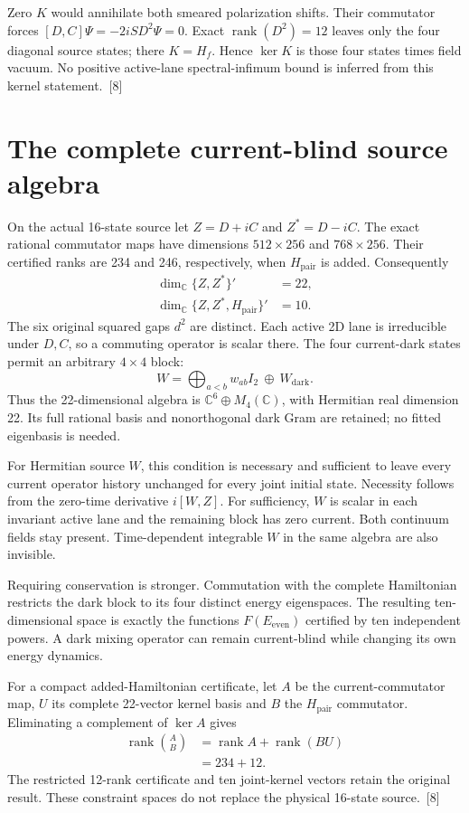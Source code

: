 \documentclass[10pt,twocolumn,letterpaper]{article}
\begin{document}
Zero $K$ would annihilate both smeared polarization shifts. Their commutator forces $[D,C]\Psi=-2iSD^2\Psi=0$. Exact $\operatorname{rank}(D^2)=12$ leaves only the four diagonal source states; there $K=H_f$. Hence $\ker K$ is those four states times field vacuum. No positive active-lane spectral-infimum bound is inferred from this kernel statement.~[8]

\section{The complete current-blind source algebra}
On the actual 16-state source let $Z=D+iC$ and $Z^*=D-iC$. The exact rational commutator maps have dimensions $512\times256$ and $768\times256$. Their certified ranks are 234 and 246, respectively, when $H_{\mathrm{pair}}$ is added. Consequently
\[
\begin{aligned}
\dim_{\mathbb C}\{Z,Z^*\}'&=22,\\
\dim_{\mathbb C}\{Z,Z^*,H_{\mathrm{pair}}\}'&=10.
\end{aligned}
\]
The six original squared gaps $d^2$ are distinct. Each active 2D lane is irreducible under $D,C$, so a commuting operator is scalar there. The four current-dark states permit an arbitrary $4\times4$ block:
\[
W=\bigoplus_{a<b}w_{ab}I_2\ \oplus\ W_{\mathrm{dark}}.
\]
Thus the 22-dimensional algebra is $\mathbb C^6\oplus M_4(\mathbb C)$, with Hermitian real dimension 22. Its full rational basis and nonorthogonal dark Gram are retained; no fitted eigenbasis is needed.

For Hermitian source $W$, this condition is necessary and sufficient to leave every current operator history unchanged for every joint initial state. Necessity follows from the zero-time derivative $i[W,Z]$. For sufficiency, $W$ is scalar in each invariant active lane and the remaining block has zero current. Both continuum fields stay present. Time-dependent integrable $W$ in the same algebra are also invisible.

Requiring conservation is stronger. Commutation with the complete Hamiltonian restricts the dark block to its four distinct energy eigenspaces. The resulting ten-dimensional space is exactly the functions $F(E_{\mathrm{even}})$ certified by ten independent powers. A dark mixing operator can remain current-blind while changing its own energy dynamics.

For a compact added-Hamiltonian certificate, let $A$ be the current-commutator map, $U$ its complete 22-vector kernel basis and $B$ the $H_{\mathrm{pair}}$ commutator. Eliminating a complement of $\ker A$ gives
\[
\begin{aligned}
\operatorname{rank}\binom AB
 &=\operatorname{rank}A+\operatorname{rank}(BU)\\
 &=234+12.
\end{aligned}
\]
The restricted 12-rank certificate and ten joint-kernel vectors retain the original result. These constraint spaces do not replace the physical 16-state source.~[8]
\end{document}
